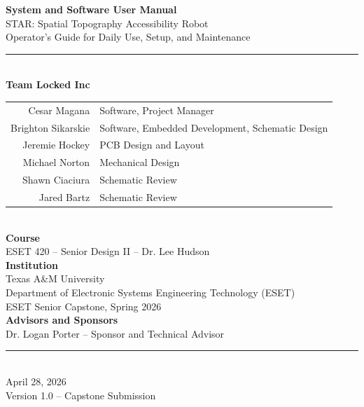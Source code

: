 \documentclass[11pt,letterpaper]{article}
\begin{document}
\thispagestyle{empty}

\begin{center}
\vspace*{1.0in}
{\Huge \bfseries System and Software User Manual}\\[0.35in]
{\LARGE STAR: Spatial Topography Accessibility Robot}\\[0.20in]
{\large Operator's Guide for Daily Use, Setup, and Maintenance}\\[0.8in]

\rule{4.5in}{0.8pt}\\[0.3in]

{\large \textbf{Team Locked Inc}}\\[0.15in]
\begin{tabular}{r l}
Cesar Magana        & Software, Project Manager \\
Brighton Sikarskie  & Software, Embedded Development, Schematic Design \\
Jeremie Hockey      & PCB Design and Layout \\
Michael Norton      & Mechanical Design \\
Shawn Ciaciura      & Schematic Review \\
Jared Bartz         & Schematic Review \\
\end{tabular}\\[0.4in]

{\large \textbf{Course}}\\[0.1in]
{\normalsize ESET 420 -- Senior Design II -- Dr. Lee Hudson}\\[0.4in]

{\large \textbf{Institution}}\\[0.1in]
{\normalsize Texas A\&M University}\\
{\normalsize Department of Electronic Systems Engineering Technology (ESET)}\\
{\normalsize ESET Senior Capstone, Spring 2026}\\[0.4in]

{\large \textbf{Advisors and Sponsors}}\\[0.1in]
{\normalsize Dr. Logan Porter -- Sponsor and Technical Advisor}\\[0.6in]

\rule{4.5in}{0.8pt}\\[0.2in]
{\large April 28, 2026}\\[0.15in]
{\small Version 1.0 -- Capstone Submission}

\end{center}
\clearpage
\end{document}
